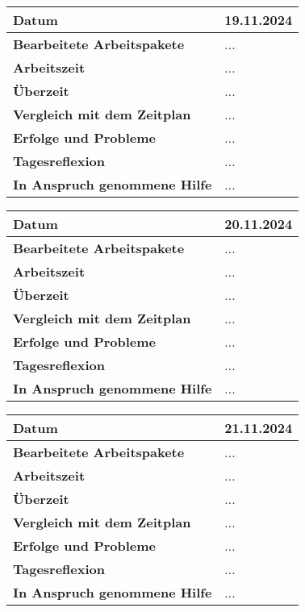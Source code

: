 \begin{longtable}{p{}|p{}}
	\hline
	\textbf{Datum}                       & 19.11.2024            \\
	\hline
	\textbf{Bearbeitete Arbeitspakete}   & ...                  \\
	\hline
	\textbf{Arbeitszeit}                 & ...                                    \\
	\hline
	\textbf{Überzeit}                    & ...                                    \\
	\hline
	\textbf{Vergleich mit dem Zeitplan}  & ... \\
	\hline
	\textbf{Erfolge und Probleme} & ...
	\\
	\hline
	\textbf{Tagesreflexion} & ...
	\\
	\hline
	\textbf{In Anspruch genommene Hilfe} & ...                              \\
	\hline
\end{longtable}\label{tab:arbeitsprotokoll-19.11.2024}
\newpage

\begin{longtable}{p{}|p{}}
	\hline
	\textbf{Datum}                       & 20.11.2024            \\
	\hline
	\textbf{Bearbeitete Arbeitspakete}   & ...                  \\
	\hline
	\textbf{Arbeitszeit}                 & ...                                    \\
	\hline
	\textbf{Überzeit}                    & ...                                    \\
	\hline
	\textbf{Vergleich mit dem Zeitplan}  & ... \\
	\hline
	\textbf{Erfolge und Probleme} & ...
	\\
	\hline
	\textbf{Tagesreflexion} & ...
	\\
	\hline
	\textbf{In Anspruch genommene Hilfe} & ...                              \\
	\hline
\end{longtable}\label{tab:arbeitsprotokoll-20.11.2024}
\newpage

\begin{longtable}{p{}|p{}}
	\hline
	\textbf{Datum}                       & 21.11.2024            \\
	\hline
	\textbf{Bearbeitete Arbeitspakete}   & ...                  \\
	\hline
	\textbf{Arbeitszeit}                 & ...                                    \\
	\hline
	\textbf{Überzeit}                    & ...                                    \\
	\hline
	\textbf{Vergleich mit dem Zeitplan}  & ... \\
	\hline
	\textbf{Erfolge und Probleme} & ...
	\\
	\hline
	\textbf{Tagesreflexion} & ...
	\\
	\hline
	\textbf{In Anspruch genommene Hilfe} & ...                              \\
	\hline
\end{longtable}\label{tab:arbeitsprotokoll-21.11.2024}
\newpage

